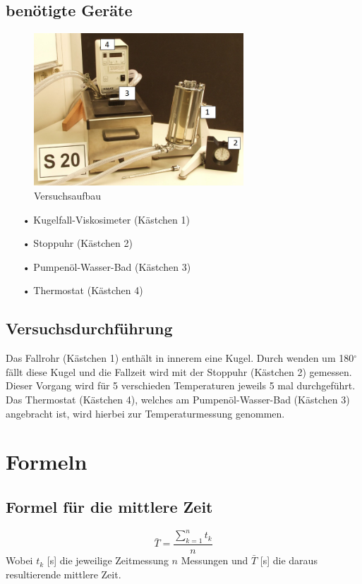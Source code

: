 \documentclass[fontsize=12pt]{scrartcl}
\begin{document}
\subsection{benötigte Geräte}
\begin{figure}[H]
\centering
\includegraphics[width=0.7\textwidth]{Graphik/Versuch}
\caption{Versuchsaufbau}
\end{figure}
\begin{itemize}
\item[•] Kugelfall-Viskosimeter (Kästchen 1)
\item[•] Stoppuhr (Kästchen 2)
\item[•] Pumpenöl-Wasser-Bad (Kästchen 3)
\item[•] Thermostat (Kästchen 4)
\end{itemize}

\subsection{Versuchsdurchführung}

Das Fallrohr (Kästchen 1) enthält in innerem eine Kugel. Durch wenden um 180$^{\circ}$ fällt diese Kugel und die Fallzeit wird mit der Stoppuhr (Kästchen 2) gemessen. Dieser Vorgang wird für 5 verschieden Temperaturen jeweils 5 mal durchgeführt. Das Thermostat (Kästchen 4), welches am Pumpenöl-Wasser-Bad (Kästchen 3) angebracht ist, wird hierbei zur Temperaturmessung genommen.
\newpage

\section{Formeln}

\subsection{Formel für die mittlere Zeit}
\begin{equation}
\bar{T}= \frac{\sum_{k=1}^n t_k}{n}
\label{t}
\end{equation}
Wobei $t_k$ [s] die jeweilige Zeitmessung $n$ Messungen und $\bar{T}$ [s] die daraus resultierende mittlere Zeit.
\end{document}
